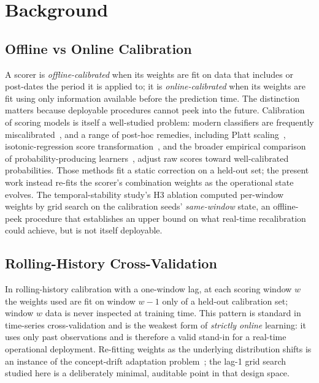 \section{Background}

\subsection{Offline vs Online Calibration}

A scorer is \textit{offline-calibrated} when its weights are fit on data
that includes or post-dates the period it is applied to; it is
\textit{online-calibrated} when its weights are fit using only information
available before the prediction time. The distinction matters because
deployable procedures cannot peek into the future. Calibration of
scoring models is itself a well-studied problem: modern classifiers
are frequently miscalibrated~\cite{guo2017calibration}, and a range of
post-hoc remedies, including Platt scaling~\cite{platt1999probabilistic},
isotonic-regression score transformation~\cite{zadrozny2002transforming},
and the broader empirical comparison of probability-producing
learners~\cite{niculescu2005predicting}, adjust raw scores toward
well-calibrated probabilities. Those methods fit a static correction on
a held-out set; the present work instead re-fits the scorer's
combination weights as the operational state evolves. The
temporal-stability study's H3
ablation computed per-window weights by grid search
on the calibration seeds' \textit{same-window} state, an offline-peek
procedure that establishes an upper bound on what real-time recalibration
could achieve, but is not itself deployable.

\subsection{Rolling-History Cross-Validation}

In rolling-history calibration with a one-window lag, at each scoring
window $w$ the weights used are fit on window $w-1$ only of a held-out
calibration set; window $w$ data is never inspected at training time.
This pattern is standard in time-series cross-validation and is the
weakest form of \textit{strictly online} learning: it uses only past
observations and is therefore a valid stand-in for a real-time
operational deployment. Re-fitting weights as the underlying
distribution shifts is an instance of the concept-drift adaptation
problem~\cite{gama2014survey}; the lag-1 grid search studied here is a
deliberately minimal, auditable point in that design space.

